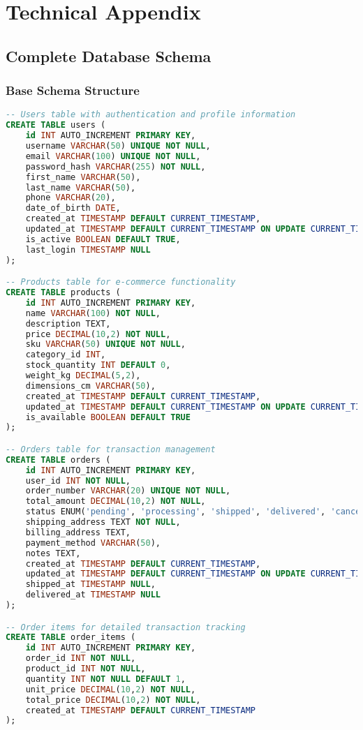 \section{Technical Appendix}

\subsection{Complete Database Schema}

\subsubsection{Base Schema Structure}
\begin{lstlisting}[language=SQL, caption=Complete Database Schema]
-- Users table with authentication and profile information
CREATE TABLE users (
    id INT AUTO_INCREMENT PRIMARY KEY,
    username VARCHAR(50) UNIQUE NOT NULL,
    email VARCHAR(100) UNIQUE NOT NULL,
    password_hash VARCHAR(255) NOT NULL,
    first_name VARCHAR(50),
    last_name VARCHAR(50),
    phone VARCHAR(20),
    date_of_birth DATE,
    created_at TIMESTAMP DEFAULT CURRENT_TIMESTAMP,
    updated_at TIMESTAMP DEFAULT CURRENT_TIMESTAMP ON UPDATE CURRENT_TIMESTAMP,
    is_active BOOLEAN DEFAULT TRUE,
    last_login TIMESTAMP NULL
);

-- Products table for e-commerce functionality
CREATE TABLE products (
    id INT AUTO_INCREMENT PRIMARY KEY,
    name VARCHAR(100) NOT NULL,
    description TEXT,
    price DECIMAL(10,2) NOT NULL,
    sku VARCHAR(50) UNIQUE NOT NULL,
    category_id INT,
    stock_quantity INT DEFAULT 0,
    weight_kg DECIMAL(5,2),
    dimensions_cm VARCHAR(50),
    created_at TIMESTAMP DEFAULT CURRENT_TIMESTAMP,
    updated_at TIMESTAMP DEFAULT CURRENT_TIMESTAMP ON UPDATE CURRENT_TIMESTAMP,
    is_available BOOLEAN DEFAULT TRUE
);

-- Orders table for transaction management
CREATE TABLE orders (
    id INT AUTO_INCREMENT PRIMARY KEY,
    user_id INT NOT NULL,
    order_number VARCHAR(20) UNIQUE NOT NULL,
    total_amount DECIMAL(10,2) NOT NULL,
    status ENUM('pending', 'processing', 'shipped', 'delivered', 'cancelled') DEFAULT 'pending',
    shipping_address TEXT NOT NULL,
    billing_address TEXT,
    payment_method VARCHAR(50),
    notes TEXT,
    created_at TIMESTAMP DEFAULT CURRENT_TIMESTAMP,
    updated_at TIMESTAMP DEFAULT CURRENT_TIMESTAMP ON UPDATE CURRENT_TIMESTAMP,
    shipped_at TIMESTAMP NULL,
    delivered_at TIMESTAMP NULL
);

-- Order items for detailed transaction tracking
CREATE TABLE order_items (
    id INT AUTO_INCREMENT PRIMARY KEY,
    order_id INT NOT NULL,
    product_id INT NOT NULL,
    quantity INT NOT NULL DEFAULT 1,
    unit_price DECIMAL(10,2) NOT NULL,
    total_price DECIMAL(10,2) NOT NULL,
    created_at TIMESTAMP DEFAULT CURRENT_TIMESTAMP
);


\end{lstlisting}
